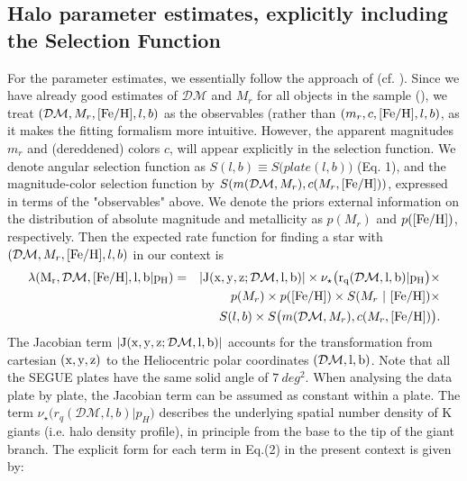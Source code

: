 \documentclass[12pt,preprint]{aastex}
\newcommand{\DM}{\mathcal{DM}}
\newcommand{\feh}{{\rm [Fe/H]}}
\begin{document}
\subsection{Halo parameter estimates, explicitly including the Selection Function}\label{sec:ParameterEstimates}

For the parameter estimates, we essentially follow the approach of \citet{Bovy2012} (cf.  \citet{Rix2013}). 
Since we have already good estimates of $\DM$ and $M_r$ for all objects in the sample (\citet{Xue2014}), we treat $(\DM,M_r,\feh,l,b)$ as the observables (rather than $(m_r,c,\feh,l,b)$, as it makes the fitting formalism more intuitive. However, the apparent magnitudes $m_r$ and (dereddened) colors $c$, will appear explicitly in the selection function.  We denote angular selection function as $S(l,b)\equiv S\bigl ( plate (l,b)\bigr )$ (Eq. 1), and the magnitude-color selection function by $S(m(\DM,M_r),c(M_r,\feh))$, expressed in terms of the "observables" above. 
We denote the priors external information on the distribution of absolute magnitude and metallicity as
$p(M_r)$ and $p(\feh)$, respectively. Then the expected rate function for finding a star with 
$(\DM,M_r,\feh,l,b)$ in our context is
\begin{eqnarray}
\rm \lambda(M_r,\DM,\feh,l,b|p_H)&=&\rm |J(x,y,z;\DM,l,b)|
   \times \nu_\star\bigl (r_q(\DM,l,b)|p_H\bigr )\times \\
   && p(M_r)\times p(\feh) \times \nonumber S(M_r~|~\feh) \times\\
&&  S(l,b) \times S\bigl ( m(\DM,M_r),c(M_r,\feh)\bigr )\nonumber.
\end{eqnarray}
The Jacobian term $\rm |J(x,y,z;\DM,l,b)|$ accounts for the transformation from cartesian $\rm (x,y,z)$ to the Heliocentric polar coordinates $\rm (\DM, l, b)$. Note that all the SEGUE plates have the same solid angle of $7~deg^2$. When analysing the data plate by plate, the Jacobian term can be assumed as constant within a plate.
 The term $\nu_\star\bigl (r_q(\DM,l,b)|p_H\bigr )$ describes the underlying spatial number density of K giants (i.e. halo density profile), in principle from the base to the tip of the giant branch. 
 The explicit form for each term in Eq.(2) in the present context is given by:
 
\end{document}
